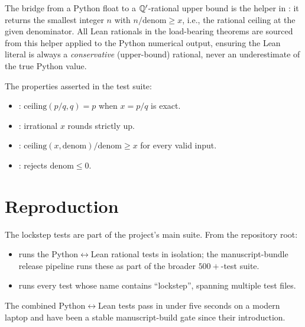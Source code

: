 %

The bridge from a Python float to a $\mathbb{Q}'$-rational upper bound is
the helper  in
: it returns the smallest integer
$n$ with $n/\mathrm{denom} \ge x$, i.e., the rational ceiling at
the given denominator.  All Lean rationals in the load-bearing
theorems are sourced from this helper applied to the Python
numerical output, ensuring the Lean literal is always a
\emph{conservative} (upper-bound) rational, never an underestimate
of the true Python value.

The properties asserted in the test suite:
\begin{itemize}[nosep]
  \item {}:
    $\mathrm{ceiling}(p/q, q) = p$ when $x = p/q$ is exact.
  \item {}:
    irrational $x$ rounds strictly up.
  \item {}:
    $\mathrm{ceiling}(x, \mathrm{denom}) / \mathrm{denom} \ge x$
    for every valid input.
  \item {}: rejects $\mathrm{denom} \le 0$.
\end{itemize}

\section{Reproduction}
\label{sec:lockstep-reproduce}

The lockstep tests are part of the project's main
 suite.  From the repository root:
\begin{itemize}
  \item {}
    runs the Python$\leftrightarrow$Lean rational tests in
    isolation; the manuscript-bundle release pipeline runs
    these as part of the broader $500+$-test suite.
  \item {} runs every test whose name
    contains ``lockstep'', spanning multiple test files.
\end{itemize}

The combined Python$\leftrightarrow$Lean tests pass in under five
seconds on a modern laptop and have been a stable manuscript-build
gate since their introduction.
